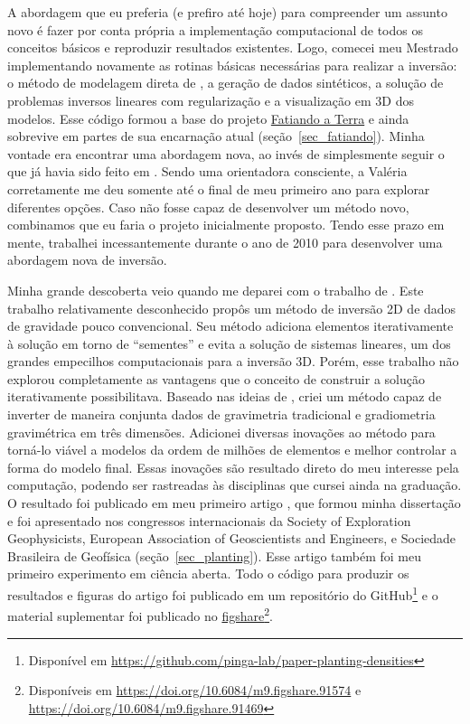 \documentclass[10pt,a4paper,oneside]{book}
\begin{document}
A abordagem que eu preferia (e prefiro até hoje) para compreender um assunto
novo é fazer por conta própria a implementação computacional de todos os
conceitos básicos e reproduzir resultados existentes.
Logo, comecei meu Mestrado implementando novamente as rotinas básicas
necessárias para realizar a inversão: o método de modelagem direta de
\citet{Nagy2000}, a geração de dados sintéticos, a solução de problemas
inversos lineares com regularização e a visualização em 3D dos modelos.
Esse código formou a base do projeto
\href{https://www.fatiando.org}{Fatiando a Terra} e ainda sobrevive em partes
de sua encarnação atual (seção~\ref{sec_fatiando}).
Minha vontade era encontrar uma abordagem nova, ao invés de simplesmente seguir
o que já havia sido feito em \citet{SilvaDias2009}.
Sendo uma orientadora consciente, a Valéria corretamente me deu somente até o
final de meu primeiro ano para explorar diferentes opções.
Caso não fosse capaz de desenvolver um método novo, combinamos que eu faria o
projeto inicialmente proposto.
Tendo esse prazo em mente, trabalhei incessantemente durante o ano de 2010 para
desenvolver uma abordagem nova de inversão.

Minha grande descoberta veio quando me deparei com o trabalho de
\citet{Rene1986}.
Este trabalho relativamente desconhecido propôs um método de inversão 2D de
dados de gravidade pouco convencional.
Seu método adiciona elementos iterativamente à solução em torno de ``sementes''
e evita a solução de sistemas lineares, um dos grandes empecilhos
computacionais para a inversão 3D.
Porém, esse trabalho não explorou completamente as vantagens que o conceito de
construir a solução iterativamente possibilitava.
Baseado nas ideias de \citet{Rene1986}, criei um método capaz de inverter de
maneira conjunta dados de gravimetria tradicional e gradiometria gravimétrica
em três dimensões.
Adicionei diversas inovações ao método para torná-lo viável a modelos da ordem
de milhões de elementos e melhor controlar a forma do modelo final.
Essas inovações são resultado direto do meu interesse pela computação, podendo
ser rastreadas às disciplinas que cursei ainda na graduação.
O resultado foi publicado em meu primeiro artigo \citep{Uieda2012}, que formou minha
dissertação e foi apresentado nos congressos internacionais da
Society of Exploration Geophysicists,
European Association of Geoscientists and Engineers,
e Sociedade Brasileira de Geofísica
(seção~\ref{sec_planting}).
Esse artigo também foi meu primeiro experimento em ciência aberta.
Todo o código para produzir os resultados e figuras do artigo foi publicado
em um repositório do GitHub\footnote{Disponível em
\url{https://github.com/pinga-lab/paper-planting-densities}} e o material
suplementar foi publicado no
\href{https://figshare.com/}{figshare}\footnote{Disponíveis em
\url{https://doi.org/10.6084/m9.figshare.91574} e
\url{https://doi.org/10.6084/m9.figshare.91469}}.
\end{document}
